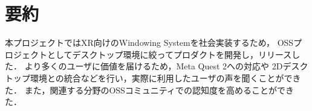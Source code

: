 \section{要約}

本プロジェクトではXR向けのWindowing Systemを社会実装するため，
OSSプロジェクトとしてデスクトップ環境に絞ってプロダクトを開発し，リリースした．
より多くのユーザに価値を届けるため，Meta Quest 2への対応や
2Dデスクトップ環境との統合などを行い，実際に利用したユーザの声を聞くことができた．
また，関連する分野のOSSコミュニティでの認知度を高めることができた．
